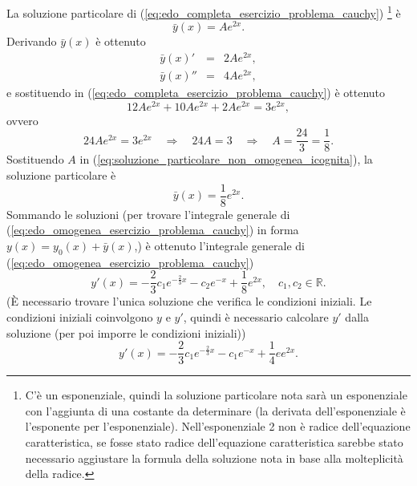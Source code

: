 \begin{example}
\begin{equation*}
	\end{equation*}
	La soluzione particolare di (\ref{eq:edo_completa_esercizio_problema_cauchy}) \footnote{C'è un esponenziale, quindi la soluzione particolare nota sarà un esponenziale con l'aggiunta di una costante da determinare (la derivata dell'esponenziale è l'esponente per l'esponenziale). Nell'esponenziale 2 non è radice dell'equazione caratteristica, se fosse stato radice dell'equazione caratteristica sarebbe stato necessario aggiustare la formula della soluzione nota in base alla molteplicità della radice.} è
	\begin{equation}\label{eq:soluzione_particolare_non_omogenea_icognita}
		\bar y(x) = A e^{2x}.
	\end{equation}
	Derivando $\bar y(x)$ è ottenuto
	\begin{equation*}
		\begin{matrix}
			\bar y(x)' &=& 2 Ae^{2x},\\
			\bar y(x)'' &=& 4Ae^{2x},
		\end{matrix}
	\end{equation*}
	e sostituendo in (\ref{eq:edo_completa_esercizio_problema_cauchy}) è ottenuto
	\begin{equation*}
		12 Ae^{2x} +10 A e^{2x} + 2Ae^{2x} = 3 e^{2x},
	\end{equation*}
	ovvero
	\begin{equation*}
		24 A e^{2x} = 3 e^{2x}\quad\Rightarrow\quad 24 A  = 3 \quad\Rightarrow\quad A=\frac{24}{3} = \frac{1}{8}.
	\end{equation*}
	Sostituendo $A$ in (\ref{eq:soluzione_particolare_non_omogenea_icognita}), la soluzione particolare è
	\begin{equation*}
		\bar y(x) = \frac{1}{8} e^{2x}.
	\end{equation*}
	Sommando le soluzioni (per trovare l'integrale generale di (\ref{eq:edo_omogenea_esercizio_problema_cauchy}) in forma $y(x) = y_0(x) + \bar y(x)$,) è ottenuto l'integrale generale di (\ref{eq:edo_omogenea_esercizio_problema_cauchy})
	\begin{equation*}
		y'(x)  = -\frac{2}{3} c_1 e^{-\frac{2}{3}x}-c_2 e^{-x}+\frac{1}{8}e^{2x},\quad c_1,c_2\in\mathbb{R}.
	\end{equation*}
	(È necessario trovare l'unica soluzione che verifica le condizioni iniziali. Le condizioni iniziali coinvolgono $y$ e $y'$, quindi è necessario calcolare $y'$ dalla soluzione (per poi imporre le condizioni iniziali))
	\begin{equation*}
		y'(x) = -\frac{2}{3} c_1 e^{-\frac{2}{3}x} - c_1 e^{-x} + \frac{1}{4}ee^{2x}.

\end{equation*}
\end{example}
